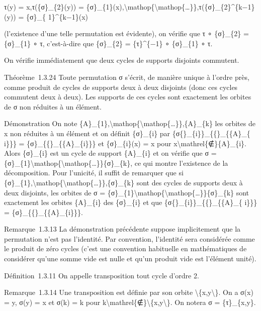 \documentclass[]{article}
\begin{document}
τ(y) = x,τ(\{σ\}\_\{2\}(y)) =
\{σ\}\_\{1\}(x),\textbackslash{}mathop\{\textbackslash{}mathop\{\ldots{}\}\},τ(\{σ\}\_\{2\}\^{}\{k−1\}(y))
= \{σ\}\_\{ 1\}\^{}\{k−1\}(x)

(l'existence d'une telle permutation est évidente), on vérifie que τ ∘
\{σ\}\_\{2\} = \{σ\}\_\{1\} ∘ τ, c'est-à-dire que \{σ\}\_\{2\} =
\{τ\}\^{}\{−1\} ∘ \{σ\}\_\{1\} ∘ τ.

On vérifie immédiatement que deux cycles de supports disjoints
commutent.

Théorème~1.3.24 Toute permutation σ s'écrit, de manière unique à l'ordre
près, comme produit de cycles de supports deux à deux disjoints (donc
ces cycles commutent deux à deux). Les supports de ces cycles sont
exactement les orbites de σ non réduites à un élément.

Démonstration On note
\{A\}\_\{1\},\textbackslash{}mathop\{\textbackslash{}mathop\{\ldots{}\}\},\{A\}\_\{k\}
les orbites de x non réduites à un élément et on définit \{σ\}\_\{i\}
par \{σ\{\}\_\{i\}\}\_\{\{\textbar{}\}\_\{\{A\}\_\{ i\}\}\} =
\{σ\}\_\{\{\textbar{}\}\_\{\{A\}\_\{i\}\}\} et \{σ\}\_\{i\}(x) = x pour
x\textbackslash{}mathrel\{∉\}\{A\}\_\{i\}. Alors \{σ\}\_\{i\} est un
cycle de support \{A\}\_\{i\} et on vérifie que σ =
\{σ\}\_\{1\}\textbackslash{}mathop\{\textbackslash{}mathop\{\ldots{}\}\}\{σ\}\_\{k\},
ce qui montre l'existence de la décomposition. Pour l'unicité, il suffit
de remarquer que si
\{σ\}\_\{1\},\textbackslash{}mathop\{\textbackslash{}mathop\{\ldots{}\}\},\{σ\}\_\{k\}
sont des cycles de supports deux à deux disjoints, les orbites de σ =
\{σ\}\_\{1\}\textbackslash{}mathop\{\textbackslash{}mathop\{\ldots{}\}\}\{σ\}\_\{k\}
sont exactement les orbites \{A\}\_\{i\} des \{σ\}\_\{i\} et que
\{σ\{\}\_\{i\}\}\_\{\{\textbar{}\}\_\{\{A\}\_\{ i\}\}\} =
\{σ\}\_\{\{\textbar{}\}\_\{\{A\}\_\{i\}\}\}.

Remarque~1.3.13 La démonstration précédente suppose implicitement que la
permutation n'est pas l'identité. Par convention, l'identité sera
considérée comme le produit de zéro cycles (c'est une convention
habituelle en mathématiques de considérer qu'une somme vide est nulle et
qu'un produit vide est l'élément unité).

Définition~1.3.11 On appelle transposition tout cycle d'ordre 2.

Remarque~1.3.14 Une transposition est définie par son orbite
\textbackslash{}\{x,y\textbackslash{}\}. On a σ(x) = y, σ(y) = x et σ(k)
= k pour
k\textbackslash{}mathrel\{∉\}\textbackslash{}\{x,y\textbackslash{}\}. On
notera σ = \{τ\}\_\{x,y\}.
\end{document}
